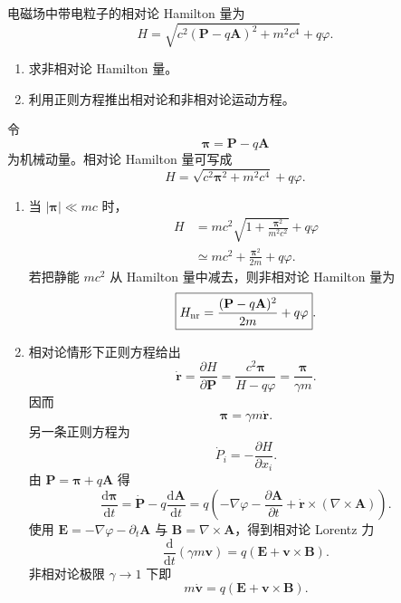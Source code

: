 \begin{question}
电磁场中带电粒子的相对论 Hamilton 量为
\[
  H=\sqrt{c^2(\mathbf P-q\mathbf A)^2+m^2c^4}+q\varphi .
\]
\begin{enumerate}
  \item 求非相对论 Hamilton 量。
  \item 利用正则方程推出相对论和非相对论运动方程。
\end{enumerate}
\begin{solution}
令
\[
  \boldsymbol\pi=\mathbf P-q\mathbf A
\]
为机械动量。相对论 Hamilton 量可写成
\[
  H=\sqrt{c^2\boldsymbol\pi^2+m^2c^4}+q\varphi .
\]
\begin{enumerate}
  \item 当 $|\boldsymbol\pi|\ll mc$ 时，
  \[
  \begin{aligned}
    H&=mc^2\sqrt{1+\frac{\boldsymbol\pi^2}{m^2c^2}}+q\varphi \\
    &\simeq mc^2+\frac{\boldsymbol\pi^2}{2m}+q\varphi .
  \end{aligned}
  \]
  若把静能 $mc^2$ 从 Hamilton 量中减去，则非相对论 Hamilton 量为
  \[
    \boxed{H_{\rm nr}=\frac{(\mathbf P-q\mathbf A)^2}{2m}+q\varphi} .
  \]

  \item 相对论情形下正则方程给出
  \[
    \dot{\mathbf r}=\frac{\partial H}{\partial \mathbf P}
    =\frac{c^2\boldsymbol\pi}{H-q\varphi}
    =\frac{\boldsymbol\pi}{\gamma m} .
  \]
  因而
  \[
    \boldsymbol\pi=\gamma m\dot{\mathbf r} .
  \]
  另一条正则方程为
  \[
    \dot{P}_i=-\frac{\partial H}{\partial x_i} .
  \]
  由 $\mathbf P=\boldsymbol\pi+q\mathbf A$ 得
  \[
    \frac{\mathrm d\boldsymbol\pi}{\mathrm dt}
    =\dot{\mathbf P}-q\frac{\mathrm d\mathbf A}{\mathrm dt}
    =q\left(-\nabla\varphi-\frac{\partial\mathbf A}{\partial t}
      +\dot{\mathbf r}\times(\nabla\times\mathbf A)\right).
  \]
  使用 $\mathbf E=-\nabla\varphi-\partial_t\mathbf A$ 与 $\mathbf B=\nabla\times\mathbf A$，得到相对论 Lorentz 力
  \[
    \boxed{\frac{\mathrm d}{\mathrm dt}(\gamma m\mathbf v)=q(\mathbf E+\mathbf v\times\mathbf B)} .
  \]
  非相对论极限 $\gamma\to1$ 下即
  \[
    \boxed{m\dot{\mathbf v}=q(\mathbf E+\mathbf v\times\mathbf B)} .
  \]
\end{enumerate}
\end{solution}
\end{question}
